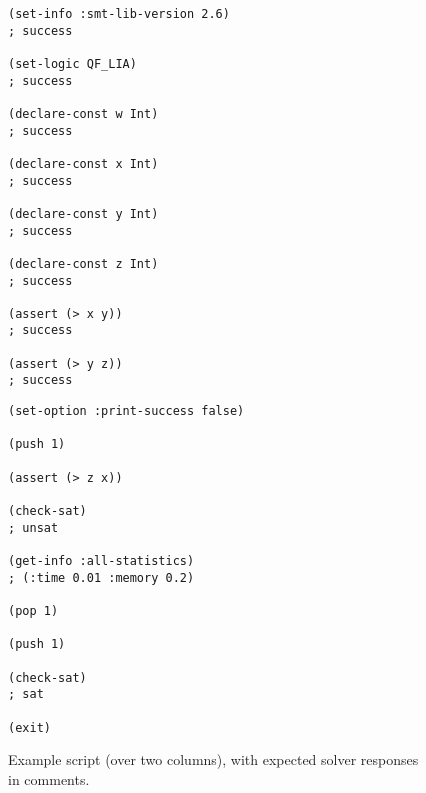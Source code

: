 \begin{figure}
\footnotesize
\begin{minipage}[t]{.5\linewidth}
\begin{verbatim}
(set-info :smt-lib-version 2.6)
; success

(set-logic QF_LIA)
; success

(declare-const w Int)
; success

(declare-const x Int)
; success

(declare-const y Int)
; success

(declare-const z Int)
; success

(assert (> x y))
; success

(assert (> y z))
; success
\end{verbatim}
\end{minipage}
%
\begin{minipage}[t]{.5\linewidth}
\begin{verbatim}
(set-option :print-success false)

(push 1)

(assert (> z x))

(check-sat)
; unsat

(get-info :all-statistics) 
; (:time 0.01 :memory 0.2)

(pop 1)

(push 1)

(check-sat)
; sat

(exit)
\end{verbatim}
\end{minipage}
\medskip

\caption{\label{fig:eg1}Example script (over two columns), with expected solver responses in comments.}
\end{figure}


